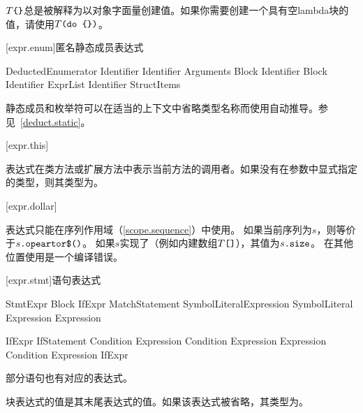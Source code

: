 \pnum
$T\texttt{\{\}}$总是被解释为以对象字面量创建值。\enternote 如果你需要创建一个具有空lambda块的值，请使用$T\texttt{(do \{\})}$。\exitnote

[expr.enum]{匿名静态成员表达式}

\begin{bnf}{DeductedEnumerator}
     Identifier \br
     Identifier \terminal{(} Arguments\bnfq \terminal{)} Block\bnfs \br
     Identifier Block \br
     Identifier \terminal{[} ExprList\bnfq \terminal{]} \br
     Identifier \terminal{\{} StructItems\bnfq \terminal{\}}
\end{bnf}

\pnum
静态成员和枚举符可以在适当的上下文中省略类型名称而使用自动推导。参见~\ref{deduct.static}。

[expr.this]{}

\pnum
表达式在类方法或扩展方法中表示当前方法的调用者。如果没有在参数中显式指定的类型，则其类型为。

[expr.dollar]{\tcode{\$}}

\pnum
表达式\tcode{\$}只能在序列作用域（\ref{scope.sequence}）中使用。
如果当前序列为$s$，则\tcode{\$}等价于$s\texttt{.opeartor\$()}$。
如果$s$实现了（例如内建数组$T\texttt{[]}$），其值为$s\texttt{.size}$。
在其他位置使用\tcode{\$}是一个编译错误。

[expr.stmt]{语句表达式}

\begin{bnf}{StmtExpr}
    Block \br
    IfExpr \br
    MatchStatement \br
     SymbolLiteral\bnfq Expression\bnfq \br
     SymbolLiteral\bnfq \br
     Expression\bnfq \br
     Expression\bnfq
\end{bnf}

\begin{bnf}{IfExpr}
    IfStatement \br
     Condition  Expression \br
     Condition  Expression  Expression \br
     Condition  Expression  IfExpr
\end{bnf}

\pnum
部分语句也有对应的表达式。

\pnum
块表达式的值是其末尾表达式的值。如果该表达式被省略，其类型为。

